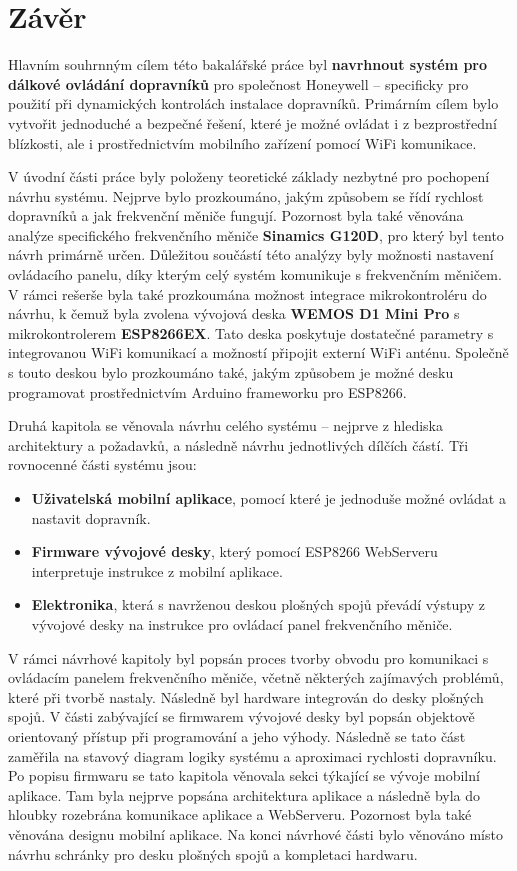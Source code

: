 \chapter*{Závěr}\label{chap:zaver}

Hlavním souhrnným cílem této bakalářské práce byl \textbf{navrhnout systém pro dálkové ovládání dopravníků} pro společnost Honeywell – specificky pro použití při dynamických kontrolách instalace dopravníků. Primárním cílem bylo vytvořit jednoduché a bezpečné řešení, které je možné ovládat i z bezprostřední blízkosti, ale i prostřednictvím mobilního zařízení pomocí WiFi komunikace.

V úvodní části práce byly položeny teoretické základy nezbytné pro pochopení návrhu systému. Nejprve bylo prozkoumáno, jakým způsobem se řídí rychlost dopravníků a jak frekvenční měniče fungují. Pozornost byla také věnována analýze specifického frekvenčního měniče \textbf{Sinamics G120D}, pro který byl tento návrh primárně určen. Důležitou součástí této analýzy byly možnosti nastavení ovládacího panelu, díky kterým celý systém komunikuje s frekvenčním měničem. V rámci rešerše byla také prozkoumána možnost integrace mikrokontroléru do návrhu, k čemuž byla zvolena vývojová deska \textbf{WEMOS D1 Mini Pro} s mikrokontrolerem \textbf{ESP8266EX}. Tato deska poskytuje dostatečné parametry s integrovanou WiFi komunikací a možností připojit externí WiFi anténu. Společně s touto deskou bylo prozkoumáno také, jakým způsobem je možné desku programovat prostřednictvím Arduino frameworku pro ESP8266.

Druhá kapitola se věnovala návrhu celého systému – nejprve z hlediska architektury a požadavků, a následně návrhu jednotlivých dílčích částí. Tři rovnocenné části systému jsou:
\begin{itemize}
	\item \textbf{Uživatelská mobilní aplikace}, pomocí které je jednoduše možné ovládat a nastavit dopravník.
	\item \textbf{Firmware vývojové desky}, který pomocí ESP8266 WebServeru interpretuje instrukce z mobilní aplikace.
	\item \textbf{Elektronika}, která s navrženou deskou plošných spojů převádí výstupy z vývojové desky na instrukce pro ovládací panel frekvenčního měniče.
\end{itemize}
V rámci návrhové kapitoly byl popsán proces tvorby obvodu pro komunikaci s ovládacím panelem frekvenčního měniče, včetně některých zajímavých problémů, které při tvorbě nastaly. Následně byl hardware integrován do desky plošných spojů. V části zabývající se firmwarem vývojové desky byl popsán objektově orientovaný přístup při programování a jeho výhody. Následně se tato část zaměřila na stavový diagram logiky systému a aproximaci rychlosti dopravníku. Po popisu firmwaru se tato kapitola věnovala sekci týkající se vývoje mobilní aplikace. Tam byla nejprve popsána architektura aplikace a následně byla do hloubky rozebrána komunikace aplikace a WebServeru. Pozornost byla také věnována designu mobilní aplikace. Na konci návrhové části bylo věnováno místo návrhu schránky pro desku plošných spojů a kompletaci hardwaru.

